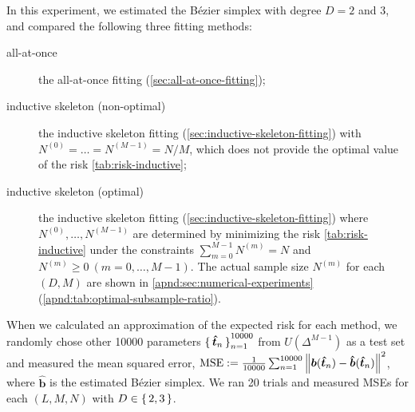 \documentclass{article}
\begin{document}
In this experiment, we estimated the B\'ezier simplex with degree $D = 2$ and 3, and compared the following three fitting methods:
\begin{description}
    \item[all-at-once] the all-at-once fitting (\cref{sec:all-at-once-fitting});
    \item[inductive skeleton (non-optimal)] the inductive skeleton fitting (\cref{sec:inductive-skeleton-fitting}) with $N^{(0)} = \dots = N^{(M - 1)} = N / M$, which does not provide the optimal value of the risk \cref{tab:risk-inductive};
    \item[inductive skeleton (optimal)] the inductive skeleton fitting (\cref{sec:inductive-skeleton-fitting}) where $N^{(0)}, \dots, N^{(M - 1)}$ are determined by minimizing the risk \cref{tab:risk-inductive} under the constraints $\sum_{m = 0}^{M-1} N^{(m)} = N$ and $N^{(m)}\geq 0~(m = 0, \dots, M-1)$. The actual sample size $N^{(m)}$ for each $(D, M)$ are shown in \cref{apnd:sec:numerical-experiments} (\cref{apnd:tab:optimal-subsample-ratio}).
\end{description}
When we calculated an approximation of the expected risk for each method, we randomly chose other 10000 parameters $\set{\bm{\hat t}_n}_{n = 1}^{10000}$ from $U(\Delta^{M - 1})$ as a test set and measured the mean squared error, $\mathrm{MSE} := \frac{1}{10000} \sum_{n = 1}^{10000} \left\| \bm b(\bm{\hat{t}}_n) - \bm{\hat{b}}(\bm{\hat{t}}_n) \right\|^2$, where $\bm{\hat{b}}$ is the estimated B\'ezier simplex.
We ran 20 trials and measured MSEs for each $(L, M, N)$ with $D \in \set{2, 3}$.
\end{document}
